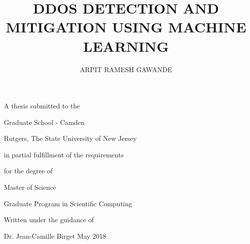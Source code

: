 \documentclass[12pt,oneside,a4paper]{article}
\title{DDOS DETECTION AND MITIGATION USING MACHINE LEARNING}
\author{ARPIT RAMESH GAWANDE}
\date{}
\begin{document}
\begin{titlepage}
  \centering
  \maketitle
  A thesis submitted to the\par
  Graduate School - Camden\par
  Rutgers, The State University of New Jersey\par
  \vspace{0.5cm}
  in partial fulfillment of the requirements\par
  for the degree of \par
  Master of Science\par
  Graduate Program in Scientific Computing\par
  \vspace{1cm}
  Written under the guidance of\par
  Dr. Jean-Camille Birget
  \vfill
  {May 2018}
\end{titlepage}
\end{document}
